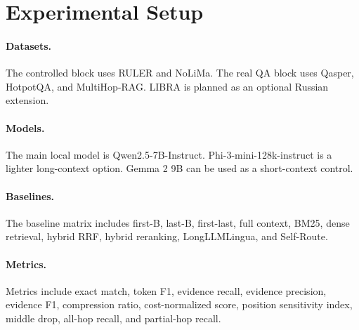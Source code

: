 \section{Experimental Setup}

\paragraph{Datasets.}
The controlled block uses RULER and NoLiMa. The real QA block uses Qasper,
HotpotQA, and MultiHop-RAG. LIBRA is planned as an optional Russian extension.

\paragraph{Models.}
The main local model is Qwen2.5-7B-Instruct. Phi-3-mini-128k-instruct is a
lighter long-context option. Gemma 2 9B can be used as a short-context control.

\paragraph{Baselines.}
The baseline matrix includes first-B, last-B, first-last, full context, BM25,
dense retrieval, hybrid RRF, hybrid reranking, LongLLMLingua, and Self-Route.

\paragraph{Metrics.}
Metrics include exact match, token F1, evidence recall, evidence precision,
evidence F1, compression ratio, cost-normalized score, position sensitivity
index, middle drop, all-hop recall, and partial-hop recall.
